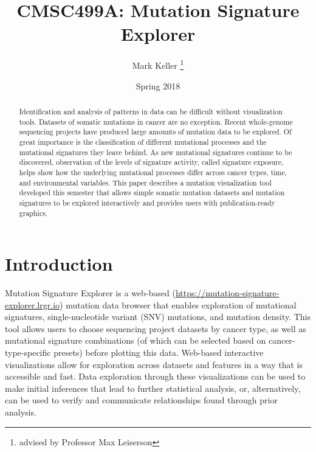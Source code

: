 \documentclass[12pt, letterpaper]{article}
\title{CMSC499A: Mutation Signature Explorer}
\author{Mark Keller \thanks{advised by Professor Max Leiserson}}
\date{Spring 2018}
\begin{document}
\maketitle

\begin{abstract}
Identification and analysis of patterns in data can be difficult without visualization tools. 
Datasets of somatic mutations in cancer are no exception.
Recent whole-genome sequencing projects have produced large amounts of mutation data to be explored.
Of great importance is the classification of different mutational processes and the mutational signatures\cite{alexandrov2013signatures} they leave behind.
As new mutational signatures continue to be discovered, observation of the levels of signature activity, called signature exposure, helps show how the underlying mutational processes differ across cancer types, time, and environmental variables.
This paper describes a mutation visualization tool developed this semester that allows simple somatic mutation datasets and mutation signatures to be explored interactively and provides users with publication-ready graphics.
\end{abstract}

\section{Introduction}
Mutation Signature Explorer is a web-based (\url{https://mutation-signature-explorer.lrgr.io}) mutation data browser that enables exploration of mutational signatures, single-nucleotide variant (SNV) mutations, and mutation density.
This tool allows users to choose sequencing project datasets by cancer type, as well as mutational signature combinations (of which can be selected based on cancer-type-specific presets) before plotting this data. 
Web-based interactive visualizations allow for exploration across datasets and features in a way that is accessible and fast.
Data exploration through these visualizations can be used to make initial inferences that lead to further statistical analysis, or, alternatively, can be used to verify and communicate relationships found through prior analysis.
\end{document}
